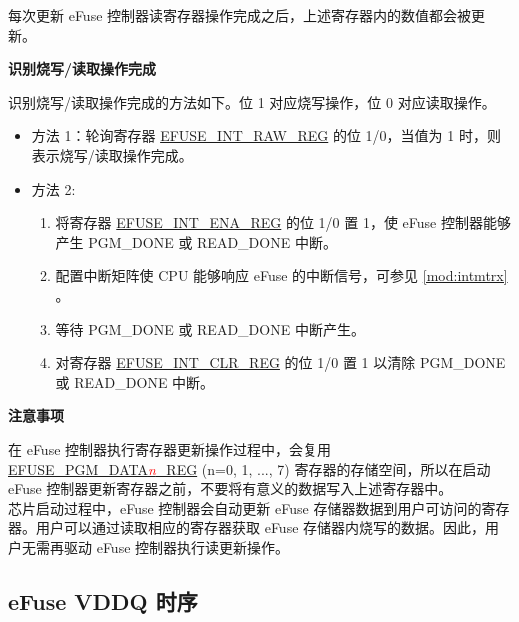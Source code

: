\documentclass[main\_\_CN.tex]{subfiles}
\begin{document}
每次更新 eFuse 控制器读寄存器操作完成之后，上述寄存器内的数值都会被更新。

{\bfseries 识别烧写/读取操作完成}

识别烧写/读取操作完成的方法如下。位 1 对应烧写操作，位 0 对应读取操作。
\begin{itemize}

    \item 方法 1：轮询寄存器 \hyperref[regdesc:EFUSEINTRAWREG]{EFUSE\_INT\_RAW\_REG} 的位 1/0，当值为 1 时，则表示烧写/读取操作完成。
    \item 方法 2:
        \begin{enumerate}
            \item 将寄存器 \hyperref[regdesc:EFUSEINTENAREG]{EFUSE\_INT\_ENA\_REG} 的位 1/0 置 1，使 eFuse 控制器能够产生 PGM\_DONE 或 READ\_DONE 中断。
            \item 配置中断矩阵使 CPU 能够响应 eFuse 的中断信号，可参见 \ref{mod:intmtrx} \textit{}。

            \item 等待 PGM\_DONE 或 READ\_DONE 中断产生。

            \item 对寄存器 \hyperref[regdesc:EFUSEINTCLRREG]{EFUSE\_INT\_CLR\_REG} 的位 1/0 置 1 以清除 PGM\_DONE 或 READ\_DONE 中断。
    \end{enumerate}
\end{itemize}

{\bfseries 注意事项}

在 eFuse 控制器执行寄存器更新操作过程中，会复用 \hyperref[regdesc:EFUSEPGMDATANREG]{EFUSE\_PGM\_DATA\textcolor{red}{\it{n}}\_REG} (n=0, 1, ..., 7) 寄存器的存储空间，所以在启动 eFuse 控制器更新寄存器之前，不要将有意义的数据写入上述寄存器中。\\
芯片启动过程中，eFuse 控制器会自动更新 eFuse 存储器数据到用户可访问的寄存器。用户可以通过读取相应的寄存器获取 eFuse 存储器内烧写的数据。因此，用户无需再驱动 eFuse 控制器执行读更新操作。

\subsection{eFuse VDDQ 时序}
\label{sec:efuse-vddq-timing}
\end{document}
